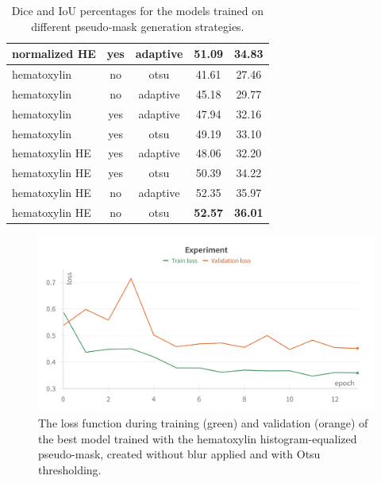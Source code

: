 \begin{table}[H]
\begin{tabular}{ l | c | c | c | c }
    normalized HE & yes & adaptive & \textbf{51.09} & \textbf{34.83} \\[0.5ex]
    \hline
    hematoxylin   & no  & otsu     & 41.61 & 27.46 \\
    hematoxylin   & no  & adaptive & 45.18 & 29.77 \\
    hematoxylin   & yes & adaptive & 47.94 & 32.16 \\
    hematoxylin   & yes & otsu     & 49.19 & 33.10 \\
    hematoxylin HE& yes & adaptive & 48.06 & 32.20 \\
    hematoxylin HE& yes & otsu     & 50.39 & 34.22 \\
    hematoxylin HE& no  & adaptive & 52.35 & 35.97 \\
    hematoxylin HE& no  & otsu     & \textbf{52.57} & \textbf{36.01} \\
    \hline
  \end{tabular}
  \caption{Dice and IoU percentages for the models trained on different pseudo‐mask generation strategies.}
  \label{tab:gen-res}
\end{table}

\begin{figure}[H]
\begin{centering}
\includegraphics[width=\textwidth]{assets/images/for_presentation/exp2-loss.png}
\par\end{centering}
\caption{The loss function during training (green) and validation (orange) of the best model trained with the hematoxylin histogram-equalized pseudo-mask, created without blur applied and with Otsu thresholding.
\label{fig:exp2-loss}}
\end{figure}

